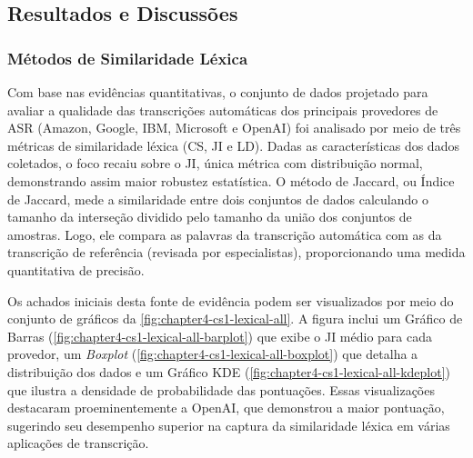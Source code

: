 \subsection{Resultados e Discussões}

\subsubsection{Métodos de Similaridade Léxica}

Com base nas evidências quantitativas, o conjunto de dados projetado para avaliar a qualidade das transcrições automáticas dos principais provedores de ASR (Amazon, Google, IBM, Microsoft e OpenAI) foi analisado por meio de três métricas de similaridade léxica (CS, JI e LD). Dadas as características dos dados coletados, o foco recaiu sobre o JI, única métrica com distribuição normal, demonstrando assim maior robustez estatística. O método de Jaccard, ou Índice de Jaccard, mede a similaridade entre dois conjuntos de dados calculando o tamanho da interseção dividido pelo tamanho da união dos conjuntos de amostras. Logo, ele compara as palavras da transcrição automática com as da transcrição de referência (revisada por especialistas), proporcionando uma medida quantitativa de precisão.

Os achados iniciais desta fonte de evidência podem ser visualizados por meio do conjunto de gráficos da \autoref{fig:chapter4-cs1-lexical-all}. A figura inclui um Gráfico de Barras (\autoref{fig:chapter4-cs1-lexical-all-barplot}) que exibe o JI médio para cada provedor, um \textit{Boxplot} (\autoref{fig:chapter4-cs1-lexical-all-boxplot}) que detalha a distribuição dos dados e um Gráfico KDE (\autoref{fig:chapter4-cs1-lexical-all-kdeplot}) que ilustra a densidade de probabilidade das pontuações. Essas visualizações destacaram proeminentemente a OpenAI, que demonstrou a maior pontuação, sugerindo seu desempenho superior na captura da similaridade léxica em várias aplicações de transcrição.

